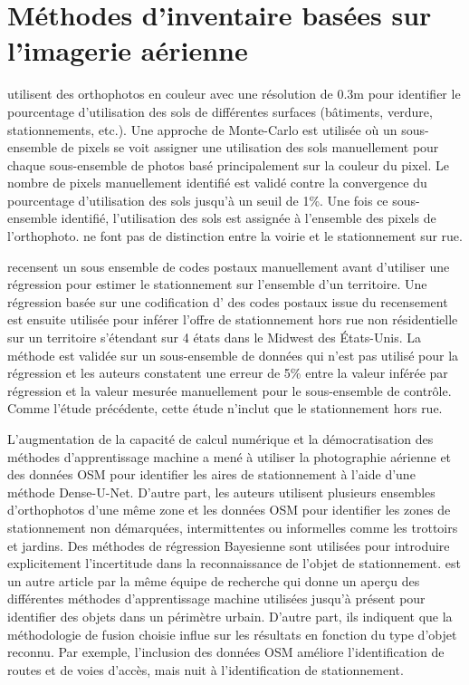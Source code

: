 \section{Méthodes d'inventaire basées sur l'imagerie aérienne}
\textcite{Akbari:AnalyzingLand:2003} utilisent des orthophotos en couleur avec une résolution de 0.3m pour identifier le pourcentage d'utilisation des sols de différentes surfaces (bâtiments, verdure, stationnements, etc.). Une approche de Monte-Carlo est utilisée où un sous-ensemble de pixels se voit assigner une utilisation des sols manuellement pour chaque sous-ensemble de photos basé principalement sur la couleur du pixel. Le nombre de pixels manuellement identifié est validé contre la convergence du pourcentage d'utilisation des sols jusqu'à un seuil de 1\%. Une fois ce sous-ensemble identifié, l'utilisation des sols est assignée à l'ensemble des pixels de l'orthophoto. \citeauthor{Akbari:AnalyzingLand:2003} ne font pas de distinction entre la voirie et le stationnement sur rue.\par
\textcite{Davis:EstimatingParking:2010} recensent un sous ensemble de codes postaux manuellement avant d'utiliser une régression pour estimer le stationnement sur l'ensemble d'un territoire. Une régression basée sur une codification d' \fg{} des codes postaux issue du recensement est ensuite utilisée pour inférer l'offre de stationnement hors rue non résidentielle sur un territoire s'étendant sur 4 états dans le Midwest des États-Unis. La méthode est validée sur un sous-ensemble de données qui n'est pas utilisé pour la régression et les auteurs constatent une erreur de 5\% entre la valeur inférée par régression et la valeur mesurée manuellement pour le sous-ensemble de contrôle. Comme l'étude précédente, cette étude n'inclut que le stationnement hors rue. \par
L'augmentation de la capacité de calcul numérique et la démocratisation des méthodes d'apprentissage machine a mené \textcite{Hellekes:ParkingSpace:2023} à utiliser la photographie aérienne et des données \ac{OSM} pour identifier les aires de stationnement à l'aide d'une méthode Dense-U-Net. D'autre part, les auteurs utilisent plusieurs ensembles d'orthophotos d'une même zone et les données \ac{OSM} pour identifier les zones de stationnement non démarquées, intermittentes ou informelles comme les trottoirs et jardins. Des méthodes de régression Bayesienne sont utilisées pour introduire explicitement l'incertitude dans la reconnaissance de l'objet de stationnement. \textcite{Henry:CitywideEstimation:2021} est un autre article par la même équipe de recherche qui donne un aperçu des différentes méthodes d'apprentissage machine utilisées jusqu'à présent pour identifier des objets dans un périmètre urbain. D'autre part, ils indiquent que la méthodologie de fusion choisie influe sur les résultats en fonction du type d'objet reconnu. Par exemple, l'inclusion des données \ac{OSM} améliore l'identification de routes et de voies d'accès, mais nuit à l'identification de stationnement.  \par
